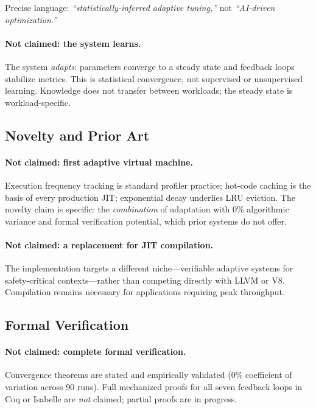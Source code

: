 Precise language: \emph{``statistically-inferred adaptive tuning,''} not
\emph{``AI-driven optimization.''}

\paragraph{Not claimed: the system learns.}
The system \emph{adapts}: parameters converge to a steady state and feedback
loops stabilize metrics. This is statistical convergence, not supervised or
unsupervised learning. Knowledge does not transfer between workloads; the
steady state is workload-specific.

\subsection{Novelty and Prior Art}

\paragraph{Not claimed: first adaptive virtual machine.}
Execution frequency tracking is standard profiler practice; hot-code caching
is the basis of every production JIT; exponential decay underlies LRU
eviction. The novelty claim is specific: the \emph{combination} of adaptation
with 0\% algorithmic variance and formal verification potential, which prior
systems do not offer.

\paragraph{Not claimed: a replacement for JIT compilation.}
The implementation targets a different niche---verifiable adaptive systems
for safety-critical contexts---rather than competing directly with LLVM or
V8. Compilation remains necessary for applications requiring peak throughput.

\subsection{Formal Verification}

\paragraph{Not claimed: complete formal verification.}
Convergence theorems are stated and empirically validated (0\% coefficient of
variation across 90 runs). Full mechanized proofs for all seven feedback loops
in Coq or Isabelle are \emph{not} claimed; partial proofs are in progress.

